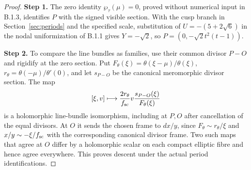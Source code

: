 \begin{proof}
\par\smallskip\noindent\textbf{Step 1.} The zero identity $\wp_\tau(\mu)=0$, proved without numerical input in B.1.3, identifies $P$ with the signed visible section. With the cusp branch in Section~\ref{sec:periods} and the specified scale, substitution of $U=-(5+2\sqrt6)$ in the nodal uniformization of B.1.1 gives $Y=-\sqrt2$, so $P=(0,-\sqrt2t^2(t-1))$.

\par\smallskip\noindent\textbf{Step 2.} To compare the line bundles as families, use their common divisor $P-O$ and rigidify at the zero section. Put $F_\theta(\xi)=\theta(\xi-\mu)/\theta(\xi)$, $r_\theta=\theta(-\mu)/\theta'(0)$, and let $s_{P-O}$ be the canonical meromorphic divisor section. The map
\[
 [\xi,v]\longmapsto\frac{2r_\theta}{f_{\rm sc}}
        v\frac{s_{P-O}(\xi)}{F_\theta(\xi)}
\]
is a holomorphic line-bundle isomorphism, including at $P,O$ after cancellation of the equal divisors. At $O$ it sends the chosen frame to $dx/y$, since $F_\theta\sim r_\theta/\xi$ and $x/y\sim-\xi/f_{\rm sc}$ with the corresponding canonical divisor frame. Two such maps that agree at $O$ differ by a holomorphic scalar on each compact elliptic fibre and hence agree everywhere. This proves descent under the actual period identifications.


\end{proof}
